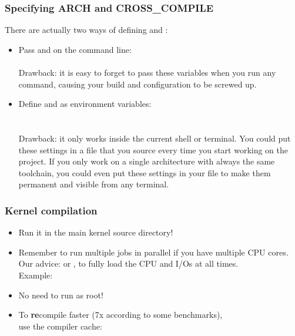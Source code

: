 \begin{frame}
  \frametitle{Specifying ARCH and CROSS\_COMPILE}
  There are actually two ways of defining  and :
  \begin{itemize}
  \item Pass  and  on the 
    command line: \\
     \\
    Drawback: it is easy to forget to pass these variables when
    you run any  command, causing your build and
    configuration to be screwed up.
  \item Define  and  as environment
    variables: \\
     \\
     \\
    Drawback: it only works inside the current
    shell or terminal. You could put these settings in a file
    that you source every time you start working on the project.
    If you only work on a single architecture with always the
    same toolchain, you could even put these settings in your
     file to make them permanent and visible from
    any terminal.
  \end{itemize}
\end{frame}

\begin{frame}[fragile]
  \frametitle{Kernel compilation}
  \begin{itemize}
    \item Run it in the main kernel source directory!
    \item Remember to run multiple jobs in parallel
          if you have multiple CPU cores. Our advice:
           or , to fully load
          the CPU and I/Os at all times.\\
          Example: 
    \item No need to run as root!
    \item To {\bf re}compile faster (7x according to some benchmarks),\\
	  use the  compiler cache:\\
    \end{itemize}
\end{frame}

